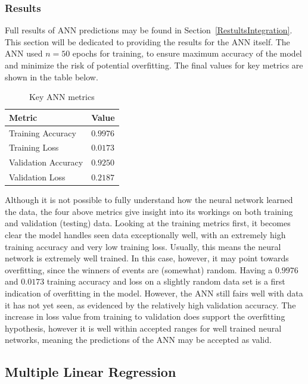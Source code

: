 \documentclass{mcmthesis}
\begin{document}
\subsubsection{Results}

Full results of ANN predictions may be found in Section~\ref{RestultsIntegration}. This section will be dedicated to providing the results for the ANN itself. The ANN used $n=50$ epochs for training, to ensure maximum accuracy of the model and minimize the risk of potential overfitting. The final values for key metrics are shown in the table below.

\begin{table}[H]
\caption{Key ANN metrics}
\centering
\vspace{5pt}
\begin{tabularx}{\textwidth} {
  >{\raggedright\arraybackslash}X 
  >{\raggedright\arraybackslash}X  }
\hline
 \textbf{Metric} & \textbf{Value} \\   
 \hline\hline
  Training Accuracy & $0.9976$\\ 
  Training Loss & $0.0173$\\
 Validation Accuracy & $0.9250$\\
 Validation Loss & $0.2187$\\ \hline
\end{tabularx}
\end{table}

Although it is not possible to fully understand how the neural network learned the data, the four above metrics give insight into its workings on both training and validation (testing) data. Looking at the training metrics first, it becomes clear the model handles seen data exceptionally well, with an extremely high training accuracy and very low training loss. Usually, this means the neural network is extremely well trained. In this case, however, it may point towards overfitting, since the winners of events are (somewhat) random. Having a $0.9976$ and $0.0173$ training accuracy and loss on a slightly random data set is a first indication of overfitting in the model. However, the ANN still fairs well with data it has not yet seen, as evidenced by the relatively high validation accuracy. The increase in loss value from training to validation does support the overfitting hypothesis, however it is well within accepted ranges for well trained neural networks, meaning the predictions of the ANN may be accepted as valid.

\subsection{Multiple Linear Regression}\label{sec:mlr}
\end{document}
